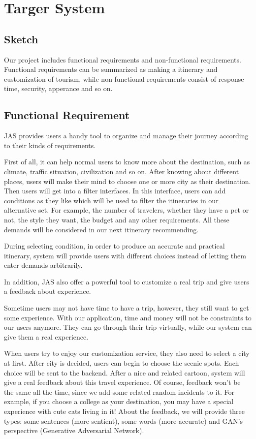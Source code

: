 \documentclass[10pt]{article}
\begin{document}
\section{Targer System}
\subsection{Sketch}
Our project includes functional requirements and non-functional requirements. Functional requirements can be summarized as making a itinerary and customization of tourism, while non-functional requirements consist of response time, security, apperance and so on.

\subsection{Functional Requirement}
JAS provides users a handy tool to organize and manage their journey according to their kinds of requirements. 

First of all, it can help normal users to know more about the destination, such as climate, traffic situation, civilization and so on. After knowing about different places, users will make their mind to choose one or more city as their destination. Then users will get into a filter interfaces. In this interface, users can add conditions as they like which will be used to filter the itineraries in our alternative set. For example, the number of travelers, whether they have a pet or not, the style they want, the budget and any other requirements. All these demands will be considered in our next itinerary recommending.

During selecting condition, in order to produce an accurate and practical itinerary, system will provide users with different choices instead of letting them enter demands arbitrarily.

In addition, JAS also offer a powerful tool to customize a real trip and give users a feedback about experience.

Sometime users may not have time to have a trip, however, they still want to get some experience. With our application, time and money will not be constraints to our users anymore.
They can go through their trip virtually, while our system can give them a real experience.

When users try to enjoy our customization service, they also need to select a city at first. After city is decided, users can begin to choose the scenic spots. Each choice will be sent to the backend. After a nice and related cartoon, system will give a real feedback about this travel experience. Of course, feedback won’t be the same all the time, since we add some related random incidents to it. For example, if you choose a college as your destination, you may have a special experience with cute cats living in it! About the feedback, we will provide three types: some sentences (more sentient), some words (more accurate) and GAN’s perspective (Generative Adversarial Network). 
\end{document}
